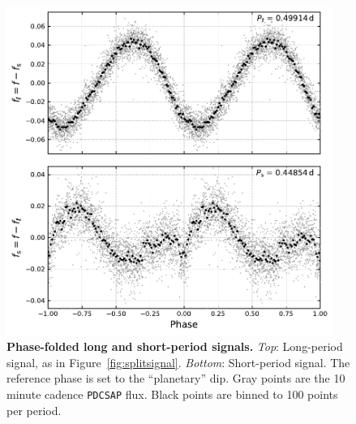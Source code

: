 \documentclass[12pt,twocolumn,tighten]{aastex62}
\begin{document}
\begin{figure}[t]
	\begin{center}
		\leavevmode
		\includegraphics[width=0.95\textwidth]{f2.pdf}
	\end{center}
	\vspace{-0.7cm}
	\caption{ {\bf Phase-folded long and short-period signals.}
	{\it Top}: Long-period signal, as in Figure~\ref{fig:splitsignal}.
	{\it Bottom}: Short-period signal. The reference phase is set to the ``planetary'' dip.
	Gray points are the 10 minute cadence \texttt{PDCSAP} flux.
	Black points are binned to 100 points per period.
	\label{fig:phasefold}
	}
\end{figure}
\end{document}
